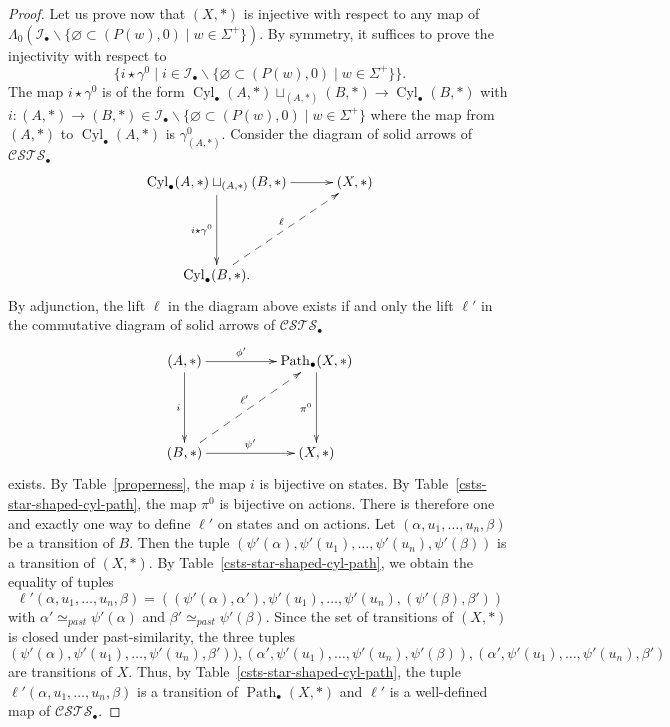 \documentclass[a4paper,12pt]{amsart}
\begin{document}
\begin{proof}
Let us prove now that $(X,*)$ is injective with respect to any map
of $\Lambda_0({\mathcal{I}}_\bullet \backslash\{\varnothing \subset (P(w),0)\mid
w \in \Sigma^+\})$.  By symmetry, it suffices to prove the injectivity
with respect to
\[\{i\star \gamma^0 \mid i\in {\mathcal{I}}_\bullet\backslash\{\varnothing
\subset (P(w),0)\mid w \in \Sigma^+\}\}.\] The map $i\star \gamma^0$
is of the form $\operatorname{{Cyl}}_\bullet(A,*) \sqcup_{(A,*)} (B,*) \to
\operatorname{{Cyl}}_\bullet(B,*)$ with $i:(A,*)\to (B,*) \in {\mathcal{I}}_\bullet\backslash
\{\varnothing \subset (P(w),0)\mid w \in \Sigma^+\}$ where the map
from $(A,*)$ to $\operatorname{{Cyl}}_\bullet(A,*)$ is $\gamma^0_{(A,*)}$. Consider
the diagram of solid arrows of ${\mathcal{C\!S\!T\!S}}_\bullet$
\[
\xymatrix@C=3em@R=5em {
  \operatorname{{Cyl}}_\bullet(A,*) \sqcup_{(A,*)} (B,*) {\ar@{->}[r]^-{{}}} {\ar@{->}[d]_-{{i\star \gamma^0}}} & (X,*) \\
  \operatorname{{Cyl}}_\bullet(B,*). \ar@{-->}[ru]^-{\ell} & }
\]
By adjunction, the lift $\ell$ in the diagram above exists if and only
the lift $\ell'$ in the commutative diagram of solid arrows of
${\mathcal{C\!S\!T\!S}}_\bullet$
\[
\xymatrix@C=5em@R=5em {
  (A,*) {\ar@{->}[r]^-{{\phi'}}} {\ar@{->}[d]_-{{i}}} & \operatorname{{Path}}_\bullet(X,*) {\ar@{->}[d]_-{{\pi^0}}}\\
  (B,*) {\ar@{->}[r]^-{{\psi'}}} \ar@{-->}[ru]^-{\ell'} & (X,*)}
\]
exists.  By Table~\ref{properness}, the map $i$ is bijective on
states.  By Table~\ref{csts-star-shaped-cyl-path}, the map $\pi^0$ is
bijective on actions.  There is therefore one and exactly one way to
define $\ell'$ on states and on actions.  Let
$(\alpha,u_1,\dots,u_n,\beta)$ be a transition of $B$. Then the tuple
$(\psi'(\alpha),\psi'(u_1),\dots,\psi'(u_n),\psi'(\beta))$ is a
transition of $(X,*)$. By Table~\ref{csts-star-shaped-cyl-path}, we
obtain the equality of tuples
\[\ell'(\alpha,u_1,\dots,u_n,\beta)=((\psi'(\alpha),\alpha'),\psi'(u_1),\dots,\psi'(u_n),(\psi'(\beta),\beta'))\]
with $\alpha'\simeq_{past}\psi'(\alpha)$ and $\beta'
\simeq_{past}\psi'(\beta)$. Since the set of transitions of $(X,*)$ is
closed under past-similarity, the three tuples
\[(\psi'(\alpha),\psi'(u_1),\dots,\psi'(u_n),\beta')),
(\alpha',\psi'(u_1),\dots,\psi'(u_n),\psi'(\beta)),(\alpha',\psi'(u_1),\dots,\psi'(u_n),\beta')\]
are transitions of $X$. Thus, by
Table~\ref{csts-star-shaped-cyl-path}, the tuple
$\ell'(\alpha,u_1,\dots,u_n,\beta)$ is a transition of
$\operatorname{{Path}}_\bullet(X,*)$ and $\ell'$ is a well-defined map of
${\mathcal{C\!S\!T\!S}}_\bullet$.


\end{proof}
\end{document}

